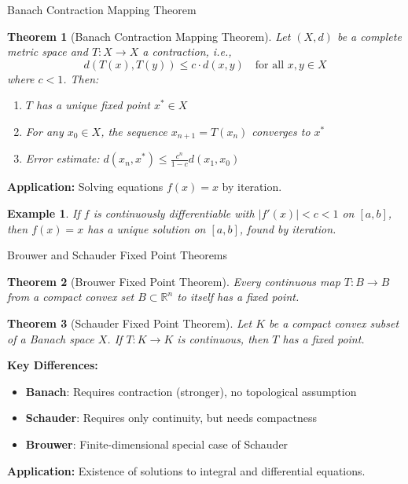 \documentclass[aspectratio=169,10pt]{beamer}
\newtheorem{thm}{Theorem}
\newtheorem{ex}{Example}
\begin{document}
\begin{frame}{Banach Contraction Mapping Theorem}
  \begin{thm}[Banach Contraction Mapping Theorem]
    Let $(X, d)$ be a complete metric space and $T: X \to X$ a contraction, i.e.,
    \[
    d(T(x), T(y)) \leq c \cdot d(x, y) \quad \text{for all } x, y \in X
    \]
    where $c < 1$. Then:
    \begin{enumerate}
      \item $T$ has a unique fixed point $x^* \in X$
      \item For any $x_0 \in X$, the sequence $x_{n+1} = T(x_n)$ converges to $x^*$
      \item Error estimate: $d(x_n, x^*) \leq \frac{c^n}{1-c} d(x_1, x_0)$
    \end{enumerate}
  \end{thm}

  \vspace{0.3cm}
  \textbf{Application:} Solving equations $f(x) = x$ by iteration.

  \vspace{0.3cm}
  \begin{ex}
    If $f$ is continuously differentiable with $|f'(x)| < c < 1$ on $[a,b]$, then $f(x) = x$ has a unique solution on $[a,b]$, found by iteration.
  \end{ex}
\end{frame}

\begin{frame}{Brouwer and Schauder Fixed Point Theorems}
  \begin{thm}[Brouwer Fixed Point Theorem]
    Every continuous map $T: B \to B$ from a compact convex set $B \subset \mathbb{R}^n$ to itself has a fixed point.
  \end{thm}

  \vspace{0.3cm}
  \begin{thm}[Schauder Fixed Point Theorem]
    Let $K$ be a compact convex subset of a Banach space $X$. If $T: K \to K$ is continuous, then $T$ has a fixed point.
  \end{thm}

  \vspace{0.3cm}
  \textbf{Key Differences:}
  \begin{itemize}
    \item \textbf{Banach}: Requires contraction (stronger), no topological assumption
    \item \textbf{Schauder}: Requires only continuity, but needs compactness
    \item \textbf{Brouwer}: Finite-dimensional special case of Schauder
  \end{itemize}

  \vspace{0.3cm}
  \textbf{Application:} Existence of solutions to integral and differential equations.
\end{frame}
\end{document}
